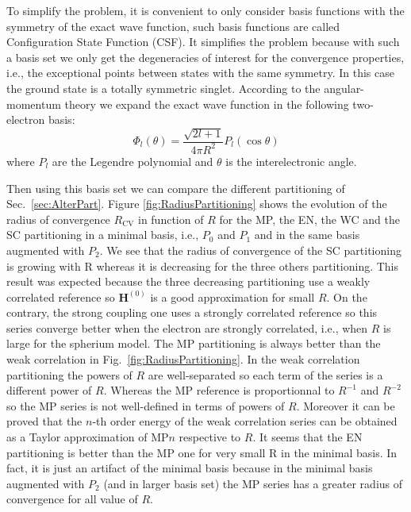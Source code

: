 \documentclass[11pt,a4paper]{article}
\newcommand{\bH}{\mathbf{H}}
\begin{document}
To simplify the problem, it is convenient to only consider basis functions with the symmetry of the exact wave function, such basis functions are called Configuration State Function (CSF). It simplifies the problem because with such a basis set we only get the degeneracies of interest for the convergence properties, i.e., the exceptional points between states with the same symmetry. In this case the ground state is a totally symmetric singlet. According to the angular-momentum theory \cite{AngularBook, SlaterBook, Loos_2009} we expand the exact wave function in the following two-electron basis:
\begin{equation}
\Phi_l(\theta)=\frac{\sqrt{2l+1}}{4\pi R^2}P_l(\cos\theta)
\end{equation}
where $P_l$ are the Legendre polynomial and $\theta$ is the interelectronic angle.

Then using this basis set we can compare the different partitioning of Sec.~\ref{sec:AlterPart}. Figure \ref{fig:RadiusPartitioning} shows the evolution of the radius of convergence $R_{\text{CV}}$ in function of $R$ for the MP, the EN, the WC and the SC partitioning in a minimal basis, i.e., $P_0$ and $P_1$ and in the same basis augmented with $P_2$. We see that the radius of convergence of the SC partitioning is growing with R whereas it is decreasing for the three others partitioning. This result was expected because the three decreasing partitioning use a weakly correlated reference so $\bH^{(0)}$ is a good approximation for small $R$. On the contrary, the strong coupling one uses a strongly correlated reference so this series converge better when the electron are strongly correlated, i.e., when $R$ is large for the spherium model.
The MP partitioning is always better than the weak correlation in Fig.~\ref{fig:RadiusPartitioning}. In the weak correlation partitioning the powers of $R$ are well-separated so each term of the series is a different power of $R$. Whereas the MP reference is proportionnal to $R^{-1}$ and $R^{-2}$ so the MP series is not well-defined in terms of powers of $R$. Moreover it can be proved that the $n$-th order energy of the weak correlation series can be obtained as a Taylor approximation of MP$n$ respective to $R$. It seems that the EN partitioning is better than the MP one for very small R in the minimal basis. In fact, it is just an artifact of the minimal basis because in the minimal basis augmented with $P_2
$ (and in larger basis set) the MP series has a greater radius of convergence for all value of $R$.
\end{document}
